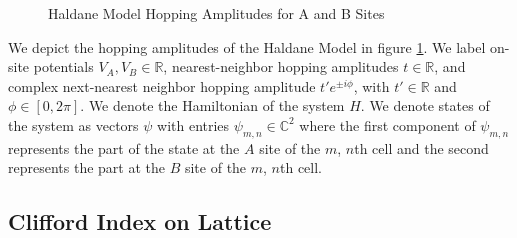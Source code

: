 \documentclass[a4paper]{article}
\begin{document}
\begin{figure}
\centering
{}%

%

\caption{Haldane Model Hopping Amplitudes for A and B Sites}%
\label{fig:hopping amplitudes}%
\end{figure}

We depict the hopping amplitudes of the Haldane Model in figure \ref{fig:hopping amplitudes}. We label on-site potentials $V_A, V_B \in \mathbb{R}$, nearest-neighbor hopping amplitudes $t\in \mathbb{R}$, and complex next-nearest neighbor hopping amplitude $t'e^{\pm i\phi}$, with $t'\in\mathbb{R}$ and $\phi\in[0,2\pi]$. We denote the Hamiltonian of the system $H$. We denote states of the system as vectors $\psi$ with entries $\psi_{m,n} \in \mathbb{C}^2$ where the first component of $\psi_{m,n}$ represents the part of the state at the $A$ site of the $m$, $n$th cell and the second represents the part at the $B$ site of the $m$, $n$th cell.

\subsection{Clifford Index on Lattice}
\end{document}
